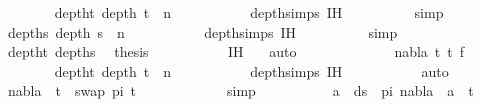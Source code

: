 \begin{isabellebody}
\ \ \ \ \ \ \isamarkupfalse%
\ deptht{}{\isacharcolon}{\kern0pt}\ {\isachardoublequoteopen}depth\ t{}\ {\isacharless}{\kern0pt}\ n{\isachardoublequoteclose}\isanewline
\ \ \ \ \ \ \ \ \isamarkupfalse%
\ {}\ depth{\isachardot}{\kern0pt}simps{\isacharparenleft}{\kern0pt}{}{\isacharparenright}{\kern0pt}\ IH\isanewline
\ \ \ \ \ \ \ \ \isamarkupfalse%
\ simp\isanewline
\ \ \ \ \ \ \isamarkupfalse%
\ depths{}{\isacharcolon}{\kern0pt}\ {\isachardoublequoteopen}depth\ s{}\ {\isacharless}{\kern0pt}\ n{\isachardoublequoteclose}\isanewline
\ \ \ \ \ \ \ \ \isamarkupfalse%
\ {}\ depth{\isachardot}{\kern0pt}simps{\isacharparenleft}{\kern0pt}{}{\isacharparenright}{\kern0pt}\ IH\isanewline
\ \ \ \ \ \ \ \ \isamarkupfalse%
\ simp\isanewline
\ \ \ \ \ \ \isamarkupfalse%
\ deptht{}\ depths{}\ \isamarkupfalse%
\ {\isacharquery}{\kern0pt}thesis\ \isanewline
\ \ \ \ \ \ \ \ \isamarkupfalse%
\ {\isachardoublequoteopen}{}{\isachardot}{\kern0pt}IH{\isachardoublequoteclose}\ {}\ \isamarkupfalse%
\ auto\isanewline
\ \ \ \ \isamarkupfalse%
\isanewline
\ \ \ \ \ \ \isamarkupfalse%
\ {\isacharparenleft}{\kern0pt}{}\ nabla\ t{}\ t{}\ f{\isacharparenright}{\kern0pt}\isanewline
\ \ \ \ \ \ \isamarkupfalse%
\ deptht{}{\isacharcolon}{\kern0pt}\ {\isachardoublequoteopen}depth\ t{}\ {\isacharless}{\kern0pt}\ n{\isachardoublequoteclose}\isanewline
\ \ \ \ \ \ \ \ \isamarkupfalse%
\ {}{\isacharparenleft}{\kern0pt}{}{\isacharparenright}{\kern0pt}\ depth{\isachardot}{\kern0pt}simps{\isacharparenleft}{\kern0pt}{}{\isacharparenright}{\kern0pt}\ IH\ \isanewline
\ \ \ \ \ \ \ \ \isamarkupfalse%
\ auto\isanewline
\ \ \ \ \ \ \isamarkupfalse%
\ {\isachardoublequoteopen}nabla\ {\isasymturnstile}\ t{}\ {\isasymapprox}\ swap\ pi\ t{}{\isachardoublequoteclose}\isanewline
\ \ \ \ \ \ \ \ \isamarkupfalse%
\ {}\ \isamarkupfalse%
\ simp\isanewline
\ \ \ \ \ \ \isamarkupfalse%
\ \isamarkupfalse%
\ {\isachardoublequoteopen}{\isasymforall}\ a\ {\isasymin}\ ds\ {\isacharbrackleft}{\kern0pt}{\isacharbrackright}{\kern0pt}\ pi{\isachardot}{\kern0pt}\ nabla\ {\isasymturnstile}\ a\ {\isasymsharp}\ t{}{\isachardoublequoteclose}\isanewline

\end{isabellebody}
